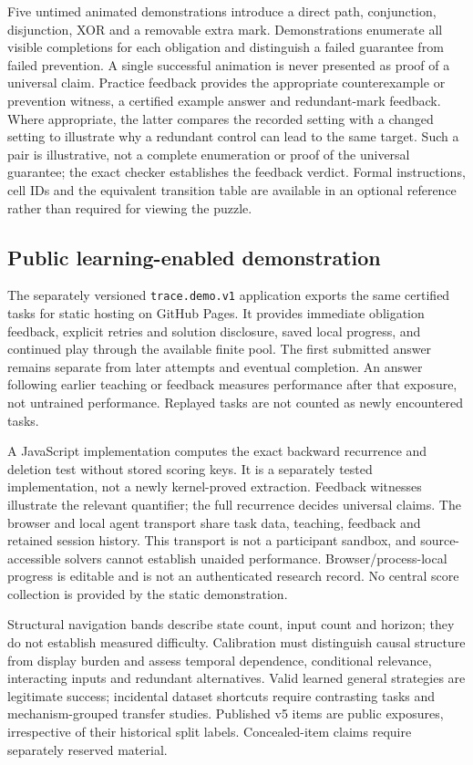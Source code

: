 \documentclass[11pt]{article}
\begin{document}
Five untimed animated demonstrations introduce a direct path, conjunction,
disjunction, XOR and a removable extra mark. Demonstrations enumerate all visible
completions for each obligation and distinguish a failed guarantee from failed
prevention. A single successful animation is never presented as proof of a
universal claim. Practice feedback provides the appropriate counterexample or
prevention witness, a certified example answer and redundant-mark feedback.
Where appropriate, the latter compares the recorded setting with a changed
setting to illustrate why a redundant control can lead to the same target.
Such a pair is illustrative, not a complete enumeration or proof of the
universal guarantee; the exact checker establishes the feedback verdict.
Formal instructions, cell IDs and the equivalent transition table are available
in an optional reference rather than required for viewing the puzzle.

\subsection{Public learning-enabled demonstration}
The separately versioned \texttt{trace.demo.v1} application exports the same
certified tasks for static hosting on GitHub Pages. It provides immediate
obligation feedback, explicit retries and solution disclosure, saved local
progress, and continued play through the available finite pool. The first
submitted answer remains separate from later attempts and eventual completion.
An answer following earlier teaching or feedback measures performance after that
exposure, not untrained performance. Replayed tasks are not counted as newly
encountered tasks.

A JavaScript implementation computes the exact backward recurrence and deletion
test without stored scoring keys. It is a separately tested implementation,
not a newly kernel-proved extraction. Feedback witnesses illustrate the relevant
quantifier; the full recurrence decides universal claims. The browser and local
agent transport share task data, teaching, feedback and retained session history.
This transport is not a participant sandbox, and source-accessible solvers cannot
establish unaided performance. Browser/process-local progress is editable and is
not an authenticated research record. No central score collection is provided by
the static demonstration.

Structural navigation bands describe state count, input count and horizon;
they do not establish measured difficulty. Calibration must distinguish causal
structure from display burden and assess temporal dependence, conditional
relevance, interacting inputs and redundant alternatives. Valid learned general
strategies are legitimate success; incidental dataset shortcuts require
contrasting tasks and mechanism-grouped transfer studies. Published v5 items are
public exposures, irrespective of their historical split labels. Concealed-item
claims require separately reserved material.
\end{document}
